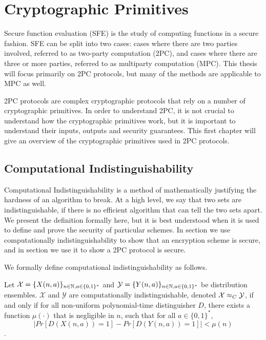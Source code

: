 \chapter{Cryptographic Primitives}
Secure function evaluation (SFE) is the study of computing functions in a secure fashion. 
SFE can be split into two cases: cases where there are two parties involved, referred to as two-party computation (2PC), and cases where there are three or more parties, referred to as multiparty computation (MPC).
This thesis will focus primarily on 2PC protocols, but many of the methods are applicable to MPC as well.

2PC protocols are complex cryptographic protocols that rely on a number of cryptographic primitives.
In order to understand 2PC, it is not crucial to understand how the cryptographic primitives work, but it is important to understand their inputs, outputs and security guarantees. 
This first chapter will give an overview of the cryptographic primitives used in 2PC protocols.

\section{Computational Indistinguishability} 
\label{sctn:computational-indistinguishability}
Computational Indistinguishability is a method of mathematically justifying the hardness of an algorithm to break. 
At a high level, we say that two sets are indistinguishable, if there is no efficient algorithm that can tell the two sets apart. 
We present the definition formally here, but it is best understood when it is used to define and prove the security of particular schemes. 
In section  we use computationally indistinguishability to show that an encryption scheme is secure, and in section  we use it to show a 2PC protocol is secure. 

We formally define computational indistinguishability as follows.

 
 \begin{definition}
 \label{defn:computational-indistinguishability}
Let $\mathcal{X} = \{X(n,a)\}_{n \in \mathbb{N}, a \in \{0,1\}^*}$ and $\mathcal{Y} = \{Y(n,a)\}_{n \in \mathbb{N}, a \in \{0,1\}^*}$ be distribution ensembles.
$\mathcal{X}$ and $\mathcal{Y}$ are computationally indistinguishable, denoted $\mathcal{X} \approx_C \mathcal{Y}$, if and only if for all non-uniform polynomial-time distinguisher $D$, there exists a function $\mu(\cdot)$ that is negligible in $n$, such that for all $a \in \{0,1\}^*$, 
\begin{equation}
    |Pr[D(X(n,a)) = 1] - Pr[D(Y(n,a)) = 1]| < \mu(n)
\end{equation}
\cite{lindell2009secure}.
\end{definition}

